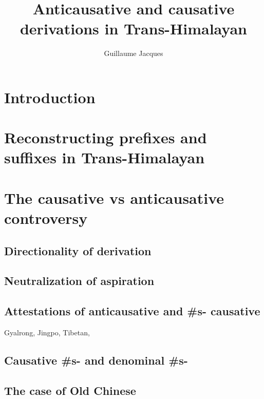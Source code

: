 \documentclass[oldfontcommands,oneside,a4paper,11pt]{article}
\begin{document}
\title{Anticausative and causative derivations in Trans-Himalayan}
\author{Guillaume Jacques}
\maketitle
\sloppy

\section{Introduction}


\section{Reconstructing prefixes and suffixes in Trans-Himalayan}

\citet{jacques12agreement}
\section{The causative vs anticausative controversy}

\subsection{Directionality of derivation}

\citet{jacques15spontaneous}
\citet{jacques15causative}
\citet{hill14voicing}

\subsection{Neutralization of aspiration}
\citet{jacques15causative}
\citet{jacques15derivational.khaling}
\subsection{Attestations of anticausative and \#s- causative}
Gyalrong, Jingpo, Tibetan, 
\citet{dai90yufa}

\citet{jacques15causative}

\subsection{Causative \#s- and denominal \#s-}

\subsection{The case of Old Chinese}
\citet{sagart03prenasalized}
\citet{mei12caus}
\citet{sagart12sprefix}
\end{document}
